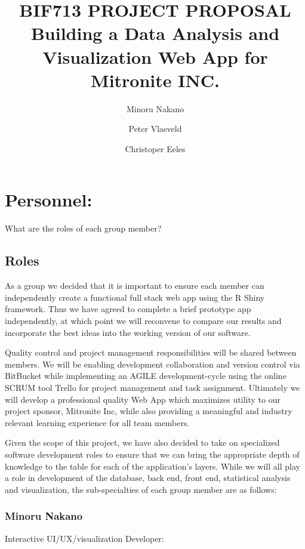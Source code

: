 \documentclass[10pt,twocolumn,letterpaper]{article}
\title{
		\usefont{OT1}{bch}{b}{n}
		\normalfont \normalsize \textsc{BIF713 PROJECT PROPOSAL} \\ [14pt]
		\huge Building a Data Analysis and Visualization Web App for Mitronite INC. \\
}
\author{Minoru Nakano}
\author{Peter Vlasveld}
\author{Christoper Eeles}
\begin{document}
\maketitle


\section{Personnel:}
    	
    	What are the roles of each group member?

            \subsection{Roles}

            As a group we decided that it is important to ensure each member can independently create a functional full stack web app using the R Shiny framework. 
	    Thus we have agreed to complete a brief prototype app independently, at which point we will reconvene to compare our results and incorporate the best 
	    ideas into the working version of our software.
		
	Quality control and project management responsibilities will be shared between members. 
	We will be enabling development collaboration and version control via BitBucket while implementing an 
	AGILE development-cycle using the online SCRUM tool Trello for project management and task assignment.
        Ultimately we will develop a professional quality Web App which maximizes utility to our project sponsor, 
	Mitronite Inc, while also providing a meaningful and industry relevant learning experience for all team members.

            Given the scope of this project, we have also decided to take on specialized software development roles to ensure that we can bring the appropriate depth 
	    of knowledge to the table for each of the application's layers. 
	    While we will all play a role in development of the database, back end, front end, statistical analysis and visualization, the sub-specialties of each group 
	    member are as follows:

                \subsubsection*{Minoru Nakano}

                Interactive UI/UX/visualization Developer:
\end{document}
